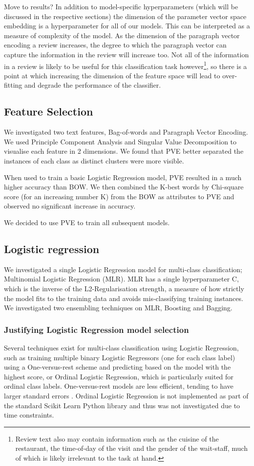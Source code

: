 \documentclass[11pt]{article}
\newcommand{\drafting}[1]{\textcolor{OliveGreen}{#1}}
\begin{document}
\drafting{Move to results?}
In addition to model-specific hyperparameters (which will be discussed in the respective sections) the dimension of the parameter vector space embedding is a hyperparameter for all of our models. This can be interpreted as a measure of complexity of the model. As the dimension of the paragraph vector encoding a review increases, the degree to which the paragraph vector can capture the information in the review will increase too. Not all of the information in a review is likely to be useful for this classification task however\footnote{Review text also may contain information such as the cuisine of the restaurant, the time-of-day of the visit and the gender of the wait-staff, much of which is likely irrelevant to the task at hand.}, so there is a point at which increasing the dimension of the feature space will lead to over-fitting and degrade the performance of the classifier.
\subsection{Feature Selection} \label{subsec:method-features}

We investigated two text features, Bag-of-words and Paragraph Vector Encoding. We used Principle Component Analysis and Singular Value Decomposition to visualise each feature in 2 dimensions. We found that PVE better separated the instances of each class as distinct clusters were more visible.

When used to train a basic Logistic Regression model, PVE resulted in a much higher accuracy than BOW. We then combined the K-best words by Chi-square score (for an increasing number K) from the BOW as attributes to PVE and observed no significant increase in accuracy.

We decided to use PVE to train all subsequent models.
\subsection{Logistic regression} \label{subsec:method-lr}
\drafting{
We investigated a single Logistic Regression model for multi-class classification; Multinomial Logistic Regression (MLR).
MLR has a single hyperparameter C, which is the inverse of the L2-Regularisation strength, a measure of how strictly the model fits to the training data and avoids mis-classifying training instances.
We investigated two ensembling techniques on MLR, Boosting and Bagging.}
\subsubsection*{Justifying Logistic Regression model selection}
\drafting{
Several techniques exist for multi-class classification using Logistic Regression, such as training multiple binary Logistic Regressors (one for each class label) using a One-versus-rest scheme and predicting based on the model with the highest score, or Ordinal Logistic Regression, which is particularly suited for ordinal class labels.
One-versus-rest models are less efficient, tending to have larger standard errors \cite{zbMATH01817585}.
Ordinal Logistic Regression is not implemented as part of the standard Scikit Learn Python library and thus was not investigated due to time constraints.
}
\end{document}
